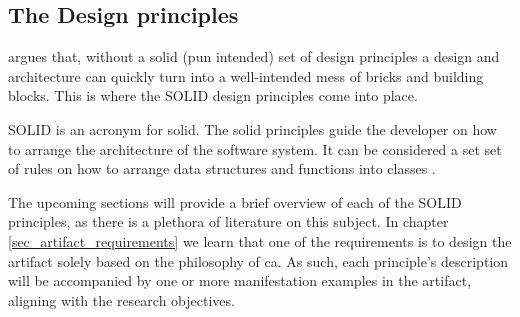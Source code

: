 \subsection{The Design principles} \label{subsec_design_principles}

 argues that, without a solid (pun intended) set of
design principles a design and architecture can quickly turn into a well-intended mess
of bricks and building blocks. This is where the SOLID design principles come into place.

SOLID is an acronym for \gls{solid}. The \gls{solid} principles guide the developer on how
to arrange the architecture of the software system. It can be considered a set set of
rules on how to arrange data structures and functions into classes
\parencite[78]{robert_c_martin_clean_2018}.

The upcoming sections will provide a brief overview of each of the SOLID principles, as
there is a plethora of literature on this subject. In chapter
\ref{sec_artifact_requirements} we learn that one of the requirements is to design the
artifact solely based on the philosophy of \gls{ca}. As such, each principle's description
will be accompanied by one or more manifestation examples in the artifact, aligning with
the research objectives.